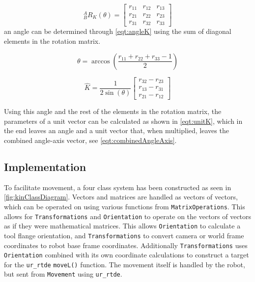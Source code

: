 \begin{equation}
     ^{A}_{B}R_{K}(\theta)
     =
    \begin{bmatrix}
        r_{11} & r_{12} & r_{13} \\
        r_{21} & r_{22} & r_{23} \\
        r_{31} & r_{32} & r_{33}
    \end{bmatrix}
    \label{eqt:rotationK}
\end{equation}
an angle can be determined through \cref{eqt:angleK} using the sum of diagonal elements in the rotation matrix.
\begin{figure}[ht]
    \begin{minipage}{0.45\textwidth}
        \centering
        \begin{equation}
            \theta = \arccos\left(\frac{r_{11} + r_{22} + r_{33} - 1}{2}\right)
            \label{eqt:angleK}
        \end{equation}
    \end{minipage}
    \hfill
    \centering
    \begin{minipage}{0.45\textwidth}
        \centering
        \begin{equation}
            \hat{K} = \frac{1}{2 \sin(\theta)}
            \begin{bmatrix}
                r_{32} - r_{23} \\
                r_{13} - r_{31} \\
                r_{21} - r_{12}
            \end{bmatrix}
            \label{eqt:unitK}
        \end{equation}
    \end{minipage}
\end{figure}

Using this angle and the rest of the elements in the rotation matrix, the parameters of a unit vector can be calculated as shown in \cref{eqt:unitK}, which in the end leaves an angle and a unit vector that, when multiplied, leaves the combined angle-axis vector, see \cref{eqt:combinedAngleAxis}.


\subsection{Implementation}
To facilitate movement, a four class system has been constructed as seen in \cref{fig:kinClassDiagram}. Vectors and matrices are handled as vectors of vectors, which can be operated on using various functions from \texttt{MatrixOperations}. This allows for \texttt{Transformations} and \texttt{Orientation} to operate on the vectors of vectors as if they were mathematical matrices. This allows \texttt{Orientation} to calculate a tool flange orientation, and \texttt{Transformations} to convert camera or world frame coordinates to robot base frame coordinates. Additionally \texttt{Transformations} uses \texttt{Orientation} combined with its own coordinate calculations to construct a target for the \texttt{ur\_rtde} \texttt{moveL()} function.
The movement itself is handled by the robot, but sent from \texttt{Movement} using \texttt{ur\_rtde}.

